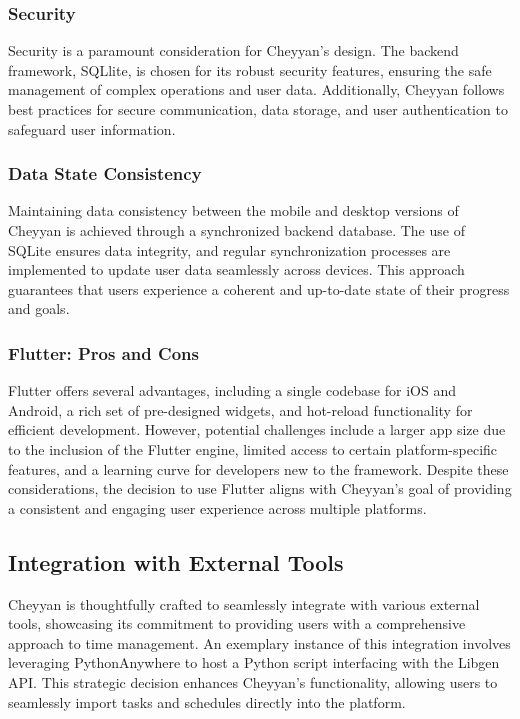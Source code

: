\documentclass{l4proj}
\begin{document}
\subsubsection{Security}
Security is a paramount consideration for Cheyyan's design. The backend framework, SQLlite, is chosen for its robust security features, ensuring the safe management of complex operations and user data. Additionally, Cheyyan follows best practices for secure communication, data storage, and user authentication to safeguard user information.

\subsubsection{Data State Consistency}
Maintaining data consistency between the mobile and desktop versions of Cheyyan is achieved through a synchronized backend database. The use of SQLite ensures data integrity, and regular synchronization processes are implemented to update user data seamlessly across devices. This approach guarantees that users experience a coherent and up-to-date state of their progress and goals.

\subsubsection{Flutter: Pros and Cons}
Flutter offers several advantages, including a single codebase for iOS and Android, a rich set of pre-designed widgets, and hot-reload functionality for efficient development. However, potential challenges include a larger app size due to the inclusion of the Flutter engine, limited access to certain platform-specific features, and a learning curve for developers new to the framework. Despite these considerations, the decision to use Flutter aligns with Cheyyan's goal of providing a consistent and engaging user experience across multiple platforms.

\subsection{Integration with External Tools}
Cheyyan is thoughtfully crafted to seamlessly integrate with various external tools, showcasing its commitment to providing users with a comprehensive approach to time management. An exemplary instance of this integration involves leveraging PythonAnywhere to host a Python script interfacing with the Libgen API. This strategic decision enhances Cheyyan's functionality, allowing users to seamlessly import tasks and schedules directly into the platform.\\
\end{document}
